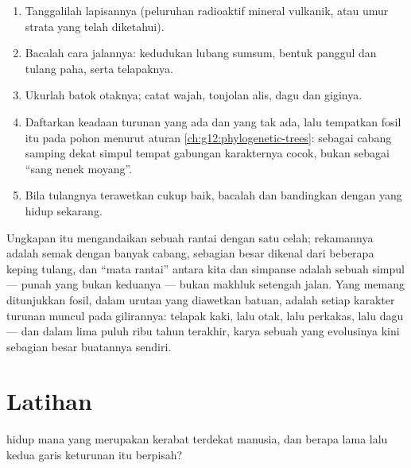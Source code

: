 \begin{method}\label{met:g12:human-evolution:placing}
\begin{enumerate}
  \item Tanggalilah lapisannya (peluruhan radioaktif mineral vulkanik,
        atau umur strata yang telah diketahui).
  \item Bacalah cara jalannya: kedudukan lubang sumsum, bentuk panggul
        dan tulang paha, serta telapaknya.
  \item Ukurlah batok otaknya; catat wajah, tonjolan alis, dagu dan
        giginya.
  \item Daftarkan keadaan turunan yang ada dan yang tak ada, lalu
        tempatkan fosil itu pada pohon menurut aturan
        \cref{ch:g12:phylogenetic-trees}: sebagai cabang samping dekat
        simpul tempat gabungan karakternya cocok, bukan sebagai ``sang
        nenek moyang''.
  \item Bila tulangnya terawetkan cukup baik, bacalah  dan
        bandingkan dengan  yang hidup sekarang.
\end{enumerate}
\end{method}

\begin{remark}\label{rem:g12:human-evolution:link}
Ungkapan itu mengandaikan sebuah rantai dengan satu celah; rekamannya
adalah semak dengan banyak cabang, sebagian besar dikenal dari
beberapa keping tulang, dan ``mata rantai'' antara kita dan simpanse
adalah sebuah simpul ---  punah yang bukan keduanya --- bukan
makhluk setengah jalan. Yang memang ditunjukkan fosil, dalam urutan
yang diawetkan batuan, adalah setiap karakter turunan muncul pada
gilirannya: telapak kaki, lalu otak, lalu perkakas, lalu dagu --- dan
dalam lima puluh ribu tahun terakhir, karya sebuah  yang
evolusinya kini sebagian besar buatannya sendiri.
\end{remark}

\section{Latihan}

\begin{exercise}[$\star$]\label{exo:g12:human-evolution:1}
 hidup mana yang merupakan kerabat terdekat manusia, dan berapa
lama lalu kedua garis keturunan itu berpisah?
\end{exercise}

